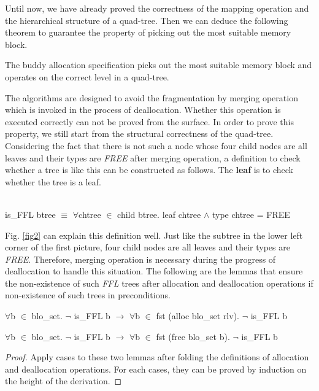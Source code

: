 Until now, we have already proved the correctness of the mapping operation and the hierarchical structure of a quad-tree. Then we can deduce the following theorem to guarantee the property of picking out the most suitable memory block.

\begin{theorem}
The buddy allocation specification picks out the most suitable memory block and operates on the correct level in a quad-tree.
\end{theorem}

The algorithms are designed to avoid the fragmentation by merging operation which is invoked in the process of deallocation. Whether this operation is executed correctly can not be proved from the surface. In order to prove this property, we still start from the structural correctness of the quad-tree. Considering the fact that there is not such a node whose four child nodes are all leaves and their types are \emph{FREE} after merging operation, a definition to check whether a tree is like this can be constructed as follows. The \textbf{leaf} is to check whether the tree is a leaf.

\begin{definition}  \\
is\_FFL btree $\equiv$ $\forall$chtree $\in$ child btree. leaf chtree $\wedge$ type chtree = FREE
\end{definition}

Fig. \ref{fig2} can explain this definition well. Just like the subtree in the lower left corner of the first picture, four child nodes are all leaves and their types are \emph{FREE}. Therefore, merging operation is necessary during the progress of deallocation to handle this situation. The following are the lemmas that ensure the non-existence of such \emph{FFL} trees after allocation and deallocation operations if non-existence of such trees in preconditions.

\begin{lemma}
$\forall$b $\in$ blo\_set. $\neg$ is\_FFL b $\longrightarrow$ $\forall$b $\in$ fst (alloc blo\_set rlv). $\neg$ is\_FFL b
\end{lemma}

\begin{lemma}
$\forall$b $\in$ blo\_set. $\neg$ is\_FFL b $\longrightarrow$ $\forall$b $\in$ fst (free blo\_set b). $\neg$ is\_FFL b
\end{lemma}

\begin{proof}
Apply cases to these two lemmas after folding the definitions of allocation and deallocation operations. For each cases, they can be proved by induction on the height of the derivation.
\end{proof}


